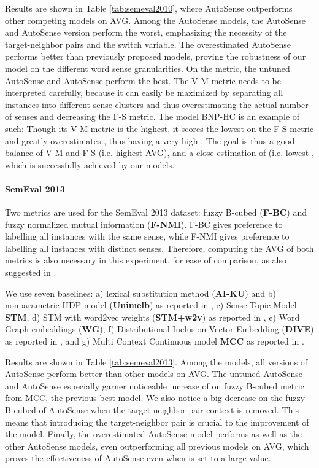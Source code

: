 \documentclass[letterpaper]{article} \usepackage{aaai19}
\begin{document}
Results are shown in Table \ref{tab:semeval2010}, where AutoSense outperforms other competing models on \textsc{AVG}. Among the AutoSense models, the AutoSense and AutoSense version perform the worst, emphasizing the necessity of the target-neighbor pairs and the switch variable. The overestimated AutoSense performs better than previously proposed models, proving the robustness of our model on the different word sense granularities. On the  metric, the untuned AutoSense and AutoSense perform the best. The V-M metric needs to be interpreted carefully, because it can easily be maximized by separating all instances into different sense clusters and thus overestimating the actual number of senses  and decreasing the F-S metric. The model BNP-HC is an example of such: Though its V-M metric is the highest, it scores the lowest on the F-S metric and greatly overestimates , thus having a very high . The goal is thus a good balance of V-M and F-S (i.e. highest \textsc{AVG}), and a close estimation of  (i.e. lowest , which is successfully achieved by our models.

\paragraph{SemEval 2013} 

Two metrics are used for the SemEval 2013 dataset: fuzzy B-cubed (\textbf{F-BC}) and fuzzy normalized mutual information (\textbf{F-NMI}). F-BC gives preference to labelling all instances with the same sense, while F-NMI gives preference to labelling all instances with distinct senses. Therefore, computing the \textsc{AVG} of both metrics is also necessary in this experiment, for ease of comparison, as also suggested in \cite{wang2015sense}.

We use seven baselines:
a) lexical substitution method (\textbf{AI-KU}) and
b) nonparametric HDP model (\textbf{Unimelb}) as reported in \cite{jurgens2013semeval},
c) Sense-Topic Model \textbf{STM},
d) STM with word2vec weights (\textbf{STM+w2v}) as reported in  \cite{wang2015sense},
e) Word Graph embeddings (\textbf{WG}), 
f) Distributional Inclusion Vector Embedding (\textbf{DIVE}) as reported in \cite{chang2018efficient},
and
g) Multi Context Continuous model \textbf{MCC} as reported in \cite{komninos2016structured}. 

Results are shown in Table \ref{tab:semeval2013}. Among the models, all versions of AutoSense perform better than other models on \textsc{AVG}. The untuned AutoSense and AutoSense especially garner noticeable increase of  on fuzzy B-cubed metric from MCC, the previous best model. We also notice a big  decrease on the fuzzy B-cubed of AutoSense when the target-neighbor pair context is removed. This means that introducing the target-neighbor pair is crucial to the improvement of the model. Finally, the overestimated AutoSense model performs as well as the other AutoSense models, even outperforming all previous models on \textsc{AVG}, which proves the effectiveness of AutoSense even when  is set to a large value.
\end{document}
